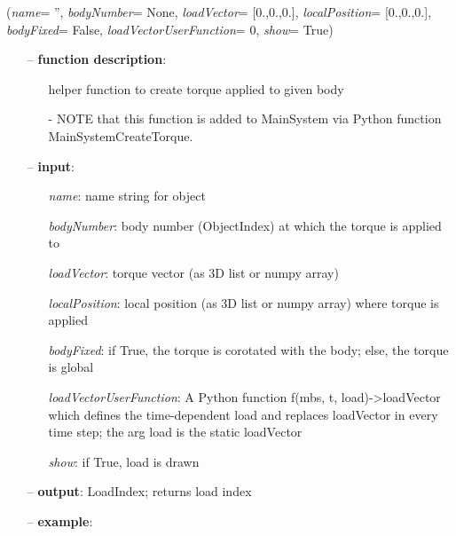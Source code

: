 %
\begin{flushleft}
\label{sec:mainsystemextensions:CreateTorque}
({\it name}= '', {\it bodyNumber}= None, {\it loadVector}= [0.,0.,0.], {\it localPosition}= [0.,0.,0.], {\it bodyFixed}= False, {\it loadVectorUserFunction}= 0, {\it show}= True)
\end{flushleft}
\setlength{\itemindent}{0.7cm}
\begin{itemize}[leftmargin=0.7cm]
\item[--]
{\bf function description}: \vspace{-6pt}
\begin{itemize}[leftmargin=1.2cm]
\setlength{\itemindent}{-0.7cm}
\item[]helper function to create torque applied to given body
\item[]- NOTE that this function is added to MainSystem via Python function MainSystemCreateTorque.
\end{itemize}
\item[--]
{\bf input}: \vspace{-6pt}
\begin{itemize}[leftmargin=1.2cm]
\setlength{\itemindent}{-0.7cm}
\item[]{\it name}: name string for object
\item[]{\it bodyNumber}: body number (ObjectIndex) at which the torque is applied to
\item[]{\it loadVector}: torque vector (as 3D list or numpy array)
\item[]{\it localPosition}: local position (as 3D list or numpy array) where torque is applied
\item[]{\it bodyFixed}: if True, the torque is corotated with the body; else, the torque is global
\item[]{\it loadVectorUserFunction}: A Python function f(mbs, t, load)->loadVector which defines the time-dependent load and replaces loadVector in every time step; the arg load is the static loadVector
\item[]{\it show}: if True, load is drawn
\end{itemize}
\item[--]
{\bf output}: LoadIndex; returns load index
\item[--]
{\bf example}: \vspace{-12pt}\ei\begin{lstlisting}[language=Python, xleftmargin=36pt]

\end{lstlisting}
\end{itemize}
